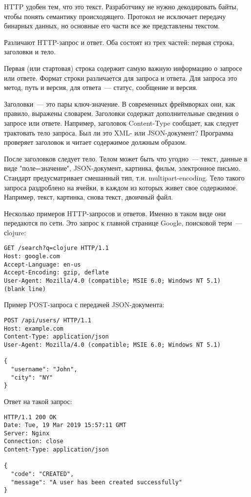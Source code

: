 HTTP удобен тем, что это текст. Разработчику не нужно декодировать байты, чтобы
понять семантику происходящего. Протокол не исключает передачу бинарных данных,
но основные его части все же представлены текстом.

Различают HTTP-запрос и ответ. Оба состоят из трех частей: первая строка,
заголовки и тело.

Первая (или стартовая) строка содержит самую важную информацию о запросе или
ответе. Формат строки различается для запроса и ответа. Для запроса это метод,
путь и версия, для ответа~--- статус, сообщение и версия.

Заголовки~--- это пары ключ-значение. В современных фреймворках они, как правило,
выражены словарем. Заголовки содержат дополнительные сведения о запросе или
ответе. Например, заголовок Content-Type сообщает, как следует трактовать тело
запроса. Был ли это XML- или JSON-документ? Программа проверяет заголовок и
читает содержимое должным образом.

После заголовков следует тело. Телом может быть что угодно~--- текст, данные в
виде "поле=значение", JSON-документ, картинка, фильм, электронное
письмо. Стандарт предусматривает смешанный тип, т.н. multipart-encoding. Тело
такого запроса раздроблено на ячейки, в каждом из которых живет свое
содержимое. Например, текст, картинка, снова текст, двоичный файл.

Несколько примеров HTTP-запросов и ответов. Именно в таком виде они передаются
по сети. Это запрос к главной странице Google, поисковой терм~--- сlojure:

\begin{verbatim}
GET /search?q=clojure HTTP/1.1
Host: google.com
Accept-Language: en-us
Accept-Encoding: gzip, deflate
User-Agent: Mozilla/4.0 (compatible; MSIE 6.0; Windows NT 5.1)
(blank line)
\end{verbatim}

Пример POST-запроса с передачей JSON-документа:

\begin{verbatim}
POST /api/users/ HTTP/1.1
Host: example.com
Content-Type: application/json
User-Agent: Mozilla/4.0 (compatible; MSIE 6.0; Windows NT 5.1)

{
  "username": "John",
  "city": "NY"
}
\end{verbatim}

Ответ на такой запрос:

\begin{verbatim}
HTTP/1.1 200 OK
Date: Tue, 19 Mar 2019 15:57:11 GMT
Server: Nginx
Connection: close
Content-Type: application/json

{
  "code": "CREATED",
  "message": "A user has been created successfully"
}
\end{verbatim}

